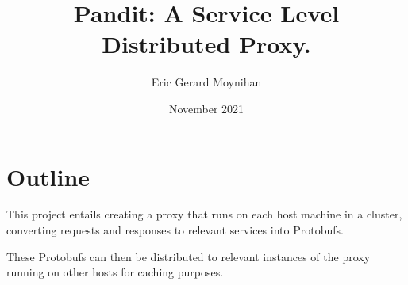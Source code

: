 \documentclass[a4paper]{article}
\title{Pandit: A Service Level Distributed Proxy.}
\author{Eric Gerard Moynihan}
\date{November 2021}
\begin{document}
\maketitle

\section{Outline}
This project entails creating a proxy that runs on each host machine in a cluster, converting requests and responses to relevant services into Protobufs. 


These Protobufs can then be distributed to relevant instances of the proxy running on other hosts for caching purposes.
\end{document}
